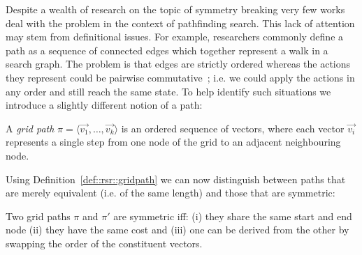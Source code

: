 Despite a wealth of research on the topic of symmetry breaking very 
few works deal with the problem in the context of pathfinding search. 
This lack of attention may stem from definitional issues. For example, researchers commonly
define a path as a sequence of connected edges which together represent a walk in 
a search graph.
The problem is that edges are strictly ordered whereas the actions they
represent could be pairwise commutative~\citep{haslum00}; i.e. we could
apply the actions in any order and still reach the same state.
To help identify such situations we introduce a slightly different notion of a
path:

\begin{definition}
\label{def::rsr::gridpath}
A \emph{grid path} $\pi = \langle \vec{v_1}, \ldots, \vec{v_k} \rangle$ is an ordered sequence 
of vectors, where each vector $\vec{v_i}$ represents a single step from one node of 
the grid to an adjacent neighbouring node. 
\end{definition}

Using Definition~\ref{def::rsr::gridpath} we can now distinguish between paths that are 
merely equivalent (i.e. of the same length) and those that are symmetric:

\begin{definition}
Two grid paths $\pi$ and $\pi'$ are symmetric iff: (i) they share the same 
start and end node (ii) they have the same cost and (iii) one can be derived from 
the other by swapping the order of the constituent vectors.
\end{definition}


